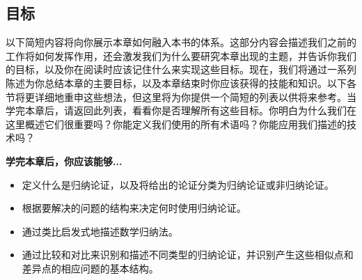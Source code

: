 \subsection{目标}

以下简短内容将向你展示本章如何融入本书的体系。这部分内容会描述我们之前的工作将如何发挥作用，还会激发我们为什么要研究本章出现的主题，并告诉你我们的目标，以及你在阅读时应该记住什么来实现这些目标。现在，我们将通过一系列陈述为你总结本章的主要目标，以及本章结束时你应该获得的技能和知识。以下各节将更详细地重申这些想法，但这里将为你提供一个简短的列表以供将来参考。当学完本章后，请返回此列表，看看你是否理解所有这些目标。你明白为什么我们在这里概述它们很重要吗？你能定义我们使用的所有术语吗？你能应用我们描述的技术吗？

\textbf{学完本章后，你应该能够...}

\begin{itemize}
    \item 定义什么是归纳论证，以及将给出的论证分类为归纳论证或非归纳论证。
    \item 根据要解决的问题的结构来决定何时使用归纳论证。
    \item 通过类比启发式地描述数学归纳法。
    \item 通过比较和对比来识别和描述不同类型的归纳论证，并识别产生这些相似点和差异点的相应问题的基本结构。
\end{itemize}
